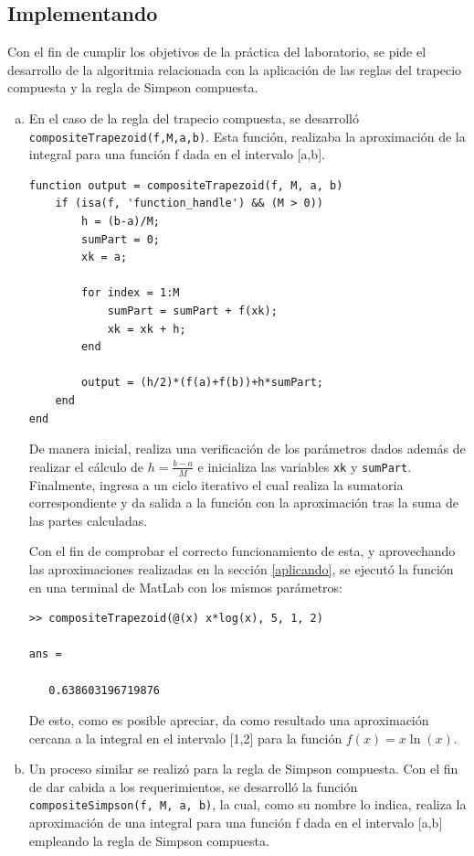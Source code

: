 \documentclass[english,notitlepage,letterpaper, 10pt]{article} %
\begin{document}
\subsection{Implementando} \label{Implementando}
  Con el fin de cumplir los objetivos de la práctica del laboratorio, se pide el desarrollo de la algoritmia relacionada con la aplicación de las reglas del trapecio compuesta y la regla de Simpson compuesta. 
\begin{enumerate}[a)]
  \item En el caso de la regla del trapecio compuesta, se desarrolló \texttt{compositeTrapezoid(f,M,a,b)}. Esta función, realizaba la aproximación de la integral para una función f dada en el intervalo [a,b]. 
  
  \begin{lstlisting}
function output = compositeTrapezoid(f, M, a, b)
    if (isa(f, 'function_handle') && (M > 0))
        h = (b-a)/M;
        sumPart = 0;
        xk = a;

        for index = 1:M
            sumPart = sumPart + f(xk);
            xk = xk + h;
        end

        output = (h/2)*(f(a)+f(b))+h*sumPart;
    end
end
  \end{lstlisting}

  De manera inicial, realiza una verificación de los parámetros dados además de realizar el cálculo de $h = \frac{b-a}{M}$ e inicializa las variables \texttt{xk} y \texttt{sumPart}. Finalmente, ingresa a un ciclo iterativo el cual realiza la sumatoria correspondiente y da salida a la función con la aproximación tras la suma de las partes calculadas.

  Con el fin de comprobar el correcto funcionamiento de esta, y aprovechando las aproximaciones realizadas en la sección \ref{aplicando}, se ejecutó la función en una terminal de MatLab con los mismos parámetros:

  \begin{lstlisting}
>> compositeTrapezoid(@(x) x*log(x), 5, 1, 2)

ans =

   0.638603196719876
  \end{lstlisting}

  De esto, como es posible apreciar, da como resultado una aproximación cercana a la integral en el intervalo [1,2] para la función $f(x) = x \ln(x)$.

  \item Un proceso similar se realizó para la regla de Simpson compuesta. Con el fin de dar cabida a los requerimientos, se desarrolló la función \texttt{compositeSimpson(f, M, a, b)}, la cual, como su nombre lo indica, realiza la aproximación de una integral para una función f dada en el intervalo [a,b] empleando la regla de Simpson compuesta.
  

\end{enumerate}
\end{document}
